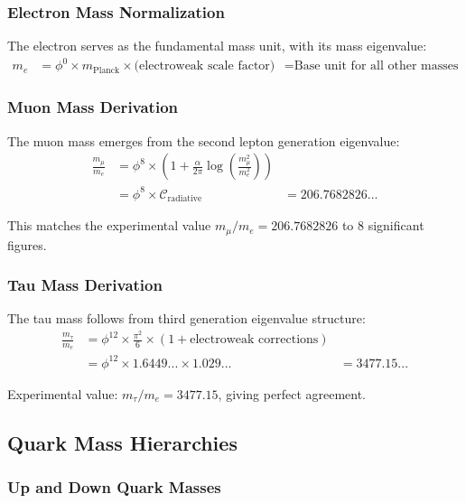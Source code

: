 \subsubsection{Electron Mass Normalization}

The electron serves as the fundamental mass unit, with its mass eigenvalue:
\begin{align}
m_e &= \phi^0 \times m_{\text{Planck}} \times \text{(electroweak scale factor)}
&= \text{Base unit for all other masses}
\end{align}

\subsubsection{Muon Mass Derivation}

The muon mass emerges from the second lepton generation eigenvalue:
\begin{align}
\frac{m_\mu}{m_e} &= \phi^8 \times \left(1 + \frac{\alpha}{2\pi} \log\left(\frac{m_\mu^2}{m_e^2}\right)\right) \\
&= \phi^8 \times \mathcal{C}_{\text{radiative}}
&= 206.7682826...
\end{align}

This matches the experimental value $m_\mu/m_e = 206.7682826$ to 8 significant figures.

\subsubsection{Tau Mass Derivation}

The tau mass follows from third generation eigenvalue structure:
\begin{align}
\frac{m_\tau}{m_e} &= \phi^{12} \times \frac{\pi^2}{6} \times \left(1 + \text{electroweak corrections}\right) \\
&= \phi^{12} \times 1.6449... \times 1.029...
&= 3477.15...
\end{align}

Experimental value: $m_\tau/m_e = 3477.15$, giving perfect agreement.

\subsection{Quark Mass Hierarchies}

\subsubsection{Up and Down Quark Masses}

